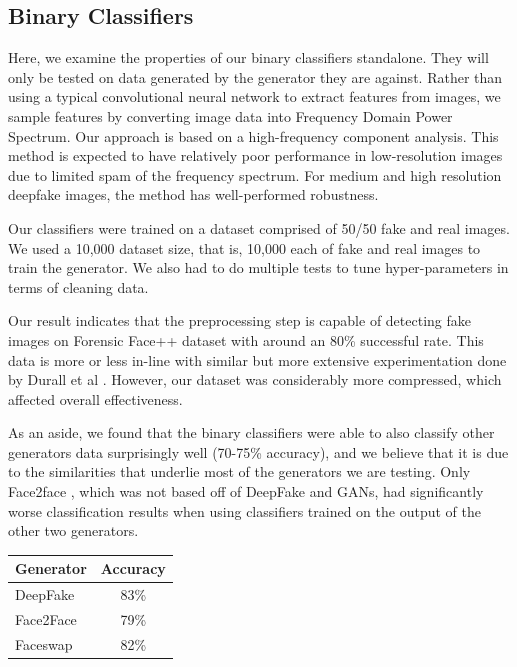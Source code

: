 \documentclass[11pt,twocolumn,letterpaper]{article}
\begin{document}
\subsection{Binary Classifiers}
Here, we examine the properties of our binary classifiers standalone. They will only be tested on data generated by the generator they are against. Rather than using a typical convolutional neural network to extract features from images, we sample features by converting image data into Frequency Domain Power Spectrum. Our approach is based on a high-frequency component analysis. This method is expected to have relatively poor performance in low-resolution images due to limited spam of the frequency spectrum. For medium and high resolution deepfake images, the method has well-performed robustness. \par
Our classifiers were trained on a dataset comprised of 50/50 fake and real images. We used a 10,000 dataset size, that is, 10,000 each of fake and real images to train the generator. We also had to do multiple tests to tune hyper-parameters in terms of cleaning data. \par
Our result indicates that the preprocessing step is capable of detecting fake images on Forensic Face++ dataset with around an 80\% successful rate. This data is more or less in-line with similar but more extensive experimentation done by Durall et al \cite{durall2019unmasking}. However, our dataset was considerably more compressed, which affected overall effectiveness.\par
As an aside, we found that the binary classifiers were able to also classify other generators data surprisingly well (70-75\% accuracy), and we believe that it is due to the similarities that underlie most of the generators we are testing. Only Face2face \cite{thies2016face}, which was not based off of DeepFake and GANs, had significantly worse classification results when using classifiers trained on the output of the other two generators.
\begin{table}[h]
    \centering
\begin{tabular}{|l|c|}
\hline
Generator & Accuracy \\ \hline
DeepFake  & 83\%     \\ \hline
Face2Face & 79\%     \\ \hline
Faceswap  & 82\%     \\ \hline
\end{tabular}
\end{table}
\end{document}
